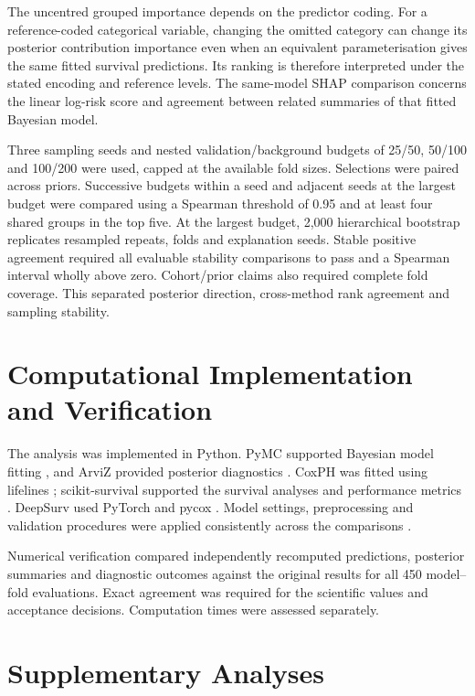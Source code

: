 The uncentred grouped importance depends on the predictor coding. For a reference-coded categorical variable, changing the omitted category can change its posterior contribution importance even when an equivalent parameterisation gives the same fitted survival predictions. Its ranking is therefore interpreted under the stated encoding and reference levels. The same-model SHAP comparison concerns the linear log-risk score and agreement between related summaries of that fitted Bayesian model.

Three sampling seeds and nested validation/background budgets of 25/50, 50/100 and 100/200 were used, capped at the available fold sizes. Selections were paired across priors. Successive budgets within a seed and adjacent seeds at the largest budget were compared using a Spearman threshold of 0.95 and at least four shared groups in the top five. At the largest budget, 2,000 hierarchical bootstrap replicates resampled repeats, folds and explanation seeds. Stable positive agreement required all evaluable stability comparisons to pass and a Spearman interval wholly above zero. Cohort/prior claims also required complete fold coverage. This separated posterior direction, cross-method rank agreement and sampling stability.

\section{Computational Implementation and Verification}\label{reproducibility-and-computational-integrity.}

The analysis was implemented in Python. PyMC supported Bayesian model fitting \cite{pymc2023}, and ArviZ provided posterior diagnostics \cite{arviz2019}. CoxPH was fitted using lifelines \cite{lifelines2019}; scikit-survival supported the survival analyses and performance metrics \cite{polsterl2020}. DeepSurv used PyTorch \cite{pytorch2019} and pycox \cite{pycox2019}. Model settings, preprocessing and validation procedures were applied consistently across the comparisons \cite{ref35,ref39,ref40,ref53}.

Numerical verification compared independently recomputed predictions, posterior summaries and diagnostic outcomes against the original results for all 450 model--fold evaluations. Exact agreement was required for the scientific values and acceptance decisions. Computation times were assessed separately.

\section{Supplementary Analyses}\label{supplementary-analyses}

